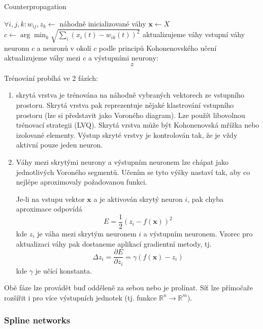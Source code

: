 \documentclass[11pt]{report} %
\newcommand{\R}{\mathbb{R}}
\renewcommand{\vec}[1]{\mathbf{#1}}
\numberwithin{equation}{section}
\begin{document}
\bigskip
\begin{algorithm}[H]
	\caption{Counterpropagation}
	\begin{algorithmic}[1]
		\State $\forall i,j,k : w_{ij}, z_{k} \gets$ náhodně inicializované váhy
		\State $\vec{x} \gets X$ 
		\State $c \gets \arg\min_k\sqrt{\sum_{i} (x_i(t) - w_{ik}(t))^2}$ 
		\State aktualizujeme váhy vstupní váhy neuronu $c$ a neuronů v okolí $c$ podle principů Kohonenovského učení
		\State aktualizujeme váhy mezi $c$ a výstupními neurony:$$z$$ 
	\end{algorithmic}
\end{algorithm}	

Trénování probíhá ve 2 fázích:
\begin{enumerate}
	\item skrytá vrstva je trénována na náhodně vybraných vektorech ze vstupního prostoru. Skrytá vrstva pak reprezentuje nějaké klastrování vstupního prostoru (lze si představit jako Voroného diagram). Lze použít libovolnou trénovací strategii (LVQ). Skrytá vrstva může být Kohonenovská mřížka nebo izolované elementy. Výstup skryté vrstvy je kontrolován tak, že je vždy aktivní pouze jeden neuron.
	
	\item Váhy mezi skrytými neurony a výstupním neuronem lze chápat jako  jednotlivých Voroného segmentů. Učením se tyto výšky nastaví tak, aby co nejlépe aproximovaly požadovanou funkci. 
	
	Je-li na vstupu vektor $\vec{x}$ a je aktivován skrytý neuron $i$, pak chyba aproximace odpovídá
	$$E = \frac{1}{2}(z_i - f(\vec{x}))^2$$
	kde $z_i$ je váha mezi skrytým neuronem $i$ a výstupním neuronem. Vzorec pro aktualizaci váhy pak dostaneme aplikací gradientní metody, tj.
	$$\Delta z_i = \frac{\partial E}{\partial z_i} = \gamma (f(\vec{x}) - z_i)$$
	kde $\gamma$ je učící konstanta.
\end{enumerate}

Obě fáze lze provádět buď odděleně za sebou nebo je prolínat. Síť lze přímočaře rozšířit i pro více výstupních jednotek (tj. funkce $\R^n \to \R^m$).

\subsubsection{Spline networks}
\end{document}

